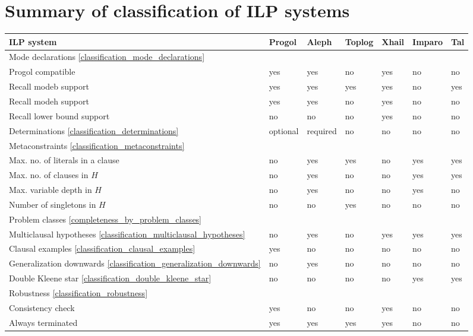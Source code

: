 \chapter{Summary of classification of ILP systems}\label{appendix_classification_summary}
\begin{center}
 \begin{tabular}{| l | l | l | l | l | l | l |}
    \hline
    ILP system & Progol & Aleph & Toplog & Xhail & Imparo & Tal \\ \hline
    \hline
    \multicolumn{7}{|l|}{Mode declarations \ref{classification_mode_declarations}} \\ \hline
    Progol compatible & yes & yes & no &  yes & no & no \\ \hline
    Recall modeb support & yes & yes & yes & yes & no & yes \\ \hline
    Recall modeh support & yes & yes & no & yes & no & no \\ \hline
    Recall lower bound support & no & no & no & yes & no & no \\ \hline
    \hline
    Determinations \ref{classification_determinations} & optional & required & no & no & no & no \\ \hline
    \hline
    \multicolumn{7}{|l|}{Metaconstraints \ref{classification_metaconstraints}} \\ \hline
    Max. no. of literals in a clause & no & yes & yes & no & yes & yes\\ \hline
    Max. no. of clauses in $H$ & no & yes & no & no & yes & yes\\ \hline
    Max. variable depth in $H$ & no & yes & no & no & yes & no\\ \hline
    Number of singletons in $H$ & no & no & yes & no & no & no\\ \hline    
    \hline
    
    \multicolumn{7}{|l|}{Problem classes \ref{completeness_by_problem_classes}} \\ \hline
    Multiclausal hypotheses \ref{classification_multiclausal_hypotheses}& no & yes & no & 
    yes & yes & yes \\ \hline
    
        \hline
    Clausal examples \ref{classification_clausal_examples}& yes & no & no & 
    no & no & no \\ \hline        
  	
  	Generalization downwards \ref{classification_generalization_downwards}
    & no & yes & no & no & no & no \\ \hline

    Double Kleene star \ref{classification_double_kleene_star} & no & no & no & no & yes & yes \\ \hline
        
    \hline
	\multicolumn{7}{|l|}{Robustness \ref{classification_robustness}} \\ \hline
    Consistency check & yes & no & no & yes & no & no \\ \hline
    Always terminated & yes & yes & yes & yes & no & no \\ \hline  
    
  \end{tabular}
  \end{center}